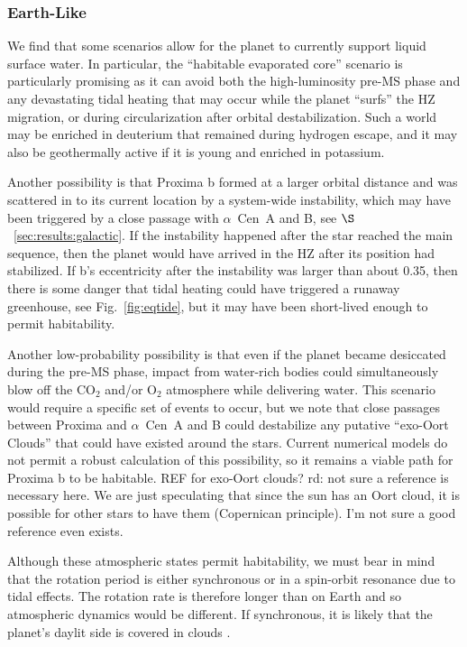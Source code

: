\documentclass[preprint,12pt]{aastex}
\newcommand{\xxx}[1]{{\color{red} #1}} %
\def\acen{{$\alpha$~Cen}}
\begin{document}
\subsubsection{Earth-Like}
\label{sec:results:atmstates:earthlike}

We find that some scenarios allow for the planet to currently support liquid
surface water. In particular, the ``habitable evaporated core'' scenario
\citep{Luger15} is particularly promising as it can avoid both the
high-luminosity pre-MS phase and any devastating tidal
heating that may occur while the planet ``surfs'' the HZ migration, or
during circularization after orbital destabilization. Such a world may
be enriched in deuterium that remained during \xxx{hydrogen} escape, and it
may also be geothermally active if it is young and enriched in
potassium.

Another possibility is that Proxima b formed at a larger orbital
distance and was scattered in to its current location by a system-wide
instability, which may have been triggered by a close passage with
\acen~A and B, see $\S$~\ref{sec:results:galactic}. If the instability
happened after the star reached the main sequence, then the planet
would have arrived in the HZ after its position had stabilized. If b's
eccentricity after the instability was larger than about 0.35, then
there is some danger that tidal heating could have triggered a runaway
greenhouse, \xxx{see Fig.~\ref{fig:eqtide}}, but it may have been
short-lived enough to permit habitability.

Another low-probability possibility is that even if the planet became
desiccated during the pre-MS phase, impact from water-rich bodies
could simultaneously blow off the CO$_2$ and/or O$_2$ atmosphere while
delivering water. This scenario would require a specific set of events to occur, but we note
that close passages between Proxima and \acen~A and B could destabilize
any putative ``exo-Oort Clouds'' that could have existed around the
stars. Current numerical models do not permit a robust calculation of
this possibility, so it remains a viable path for Proxima b to be
habitable. \xxx{REF for exo-Oort clouds?} \xxx{rd: not sure a reference is 
necessary here. We are just speculating that since the sun
has an Oort cloud, it is possible for other stars to have them (Copernican
principle). I'm not sure a good reference even exists.}

Although these atmospheric states permit habitability, we must bear in
mind that the rotation period is either synchronous or in a spin-orbit
resonance due to tidal effects. The rotation rate is therefore longer
than on Earth and so atmospheric dynamics would be different. If
synchronous, it is likely that the planet's daylit side is
covered in clouds \citep{Yang13}.
\end{document}

